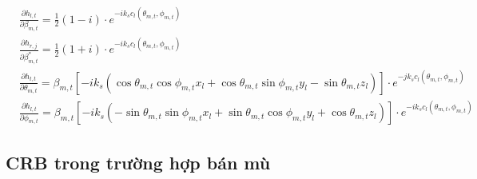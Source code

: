 \begin{subequations}
\label{eq:15}
    \begin{align}
    &\frac{\partial h_{l, t}}{\partial \beta_{m, t}}= \frac{1}{2} (1 - i) \cdot e^{-i k_s c_l(\theta_{m, t}, \phi_{m, t})} &  \\
    &\frac{\partial h_{r, j}}{\partial \beta^*_{m, t}}= \frac{1}{2} (1 + i) \cdot e^{-i k_s c_l(\theta_{m, t}, \phi_{m, t})} \\
    &\frac{\partial h_{l, t}}{\partial \theta_{m, t}}=
    \beta_{m, t} 
    [-i k_s (\cos\theta_{m, t} \cos\phi_{m, t} x_l + \cos\theta_{m, t} \sin\phi_{m, t} y_l
    - \sin \theta_{m, t} z_l)] \cdot e^{-j k_s c_l(\theta_{m, t}, \phi_{m, t})} \\ 
    &
    \frac{\partial h_{l, t}}{\partial \phi_{m, t}}=\beta_{m, t}
     [-i k_s (-\sin\theta_{m, t} \sin\phi_{m, t} x_l + \sin\theta_{m, t} \cos\phi_{m, t} y_l 
    + \cos \theta_{m, t} z_l)] \cdot e^{-i k_s c_l(\theta_{m, t}, \phi_{m, t})}
    \end{align}
\end{subequations}

\subsection{CRB trong trường hợp bán mù}


